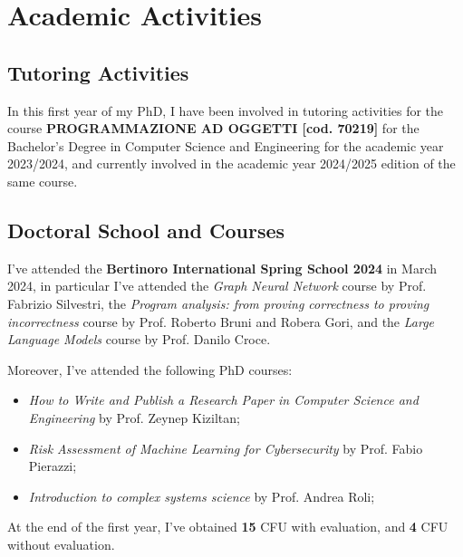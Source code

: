 \documentclass[runningheads]{llncs}
\begin{document}


\section{Academic Activities}

\subsection{Tutoring Activities}

In this first year of my PhD,
I have been involved in tutoring activities for the course \textbf{PROGRAMMAZIONE AD OGGETTI [cod. 70219]} for the Bachelor's Degree in Computer Science and Engineering for the academic year 2023/2024,
and currently involved in the academic year 2024/2025 edition of the same course.

\subsection{Doctoral School and Courses}

I've attended the \textbf{Bertinoro International Spring School 2024} in March 2024,
in particular I've attended the \emph{Graph Neural Network} course by Prof. Fabrizio Silvestri,
the \emph{Program analysis: from proving correctness to proving incorrectness} course by Prof. Roberto Bruni and Robera Gori,
and the \emph{Large Language Models} course by Prof. Danilo Croce.

Moreover,
I've attended the following PhD courses:
\begin{itemize}
    \item \emph{How to Write and Publish a Research Paper in Computer Science and Engineering} by Prof. Zeynep Kiziltan;
    \item \emph{Risk Assessment of Machine Learning for Cybersecurity} by Prof. Fabio Pierazzi;
    \item \emph{Introduction to complex systems science} by Prof. Andrea Roli;
\end{itemize}

At the end of the first year,
I've obtained \textbf{15} CFU with evaluation, and \textbf{4} CFU without evaluation.
\end{document}
